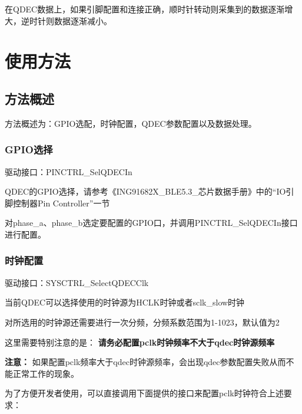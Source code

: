 \documentclass[
  12pt,
]{book}
\newenvironment{Shaded}{\begin{snugshade}}{\end{snugshade}}
\newcommand{\ControlFlowTok}[1]{\textcolor[rgb]{0.13,0.29,0.53}{\textbf{#1}}}
\newcommand{\DataTypeTok}[1]{\textcolor[rgb]{0.13,0.29,0.53}{#1}}
\newcommand{\DecValTok}[1]{\textcolor[rgb]{0.00,0.00,0.81}{#1}}
\newcommand{\NormalTok}[1]{#1}
\begin{document}
在QDEC数据上，如果引脚配置和连接正确，顺时针转动则采集到的数据逐渐增大，逆时针则数据逐渐减小。

\hypertarget{ux4f7fux7528ux65b9ux6cd5-5}{%
\section{使用方法}\label{ux4f7fux7528ux65b9ux6cd5-5}}

\hypertarget{ux65b9ux6cd5ux6982ux8ff0-5}{%
\subsection{方法概述}\label{ux65b9ux6cd5ux6982ux8ff0-5}}

方法概述为：GPIO选配，时钟配置，QDEC参数配置以及数据处理。

\hypertarget{gpioux9009ux62e9}{%
\subsubsection{GPIO选择}\label{gpioux9009ux62e9}}

驱动接口：PINCTRL\_SelQDECIn

QDEC的GPIO选择，请参考《ING91682X\_BLE5.3\_芯片数据手册》中的``IO引脚控制器Pin Controller''一节

对phase\_a、phase\_b选定要配置的GPIO口，并调用PINCTRL\_SelQDECIn接口进行配置。

\hypertarget{ux65f6ux949fux914dux7f6e-1}{%
\subsubsection{时钟配置}\label{ux65f6ux949fux914dux7f6e-1}}

驱动接口：SYSCTRL\_SelectQDECClk

当前QDEC可以选择使用的时钟源为HCLK时钟或者sclk\_slow时钟

对所选用的时钟源还需要进行一次分频，分频系数范围为1-1023，默认值为2

这里需要特别注意的是： \textbf{请务必配置pclk时钟频率不大于qdec时钟源频率}

\textbf{注意：} 如果配置pclk频率大于qdec时钟源频率，会出现qdec参数配置失败从而不能正常工作的现象。

为了方便开发者使用，可以直接调用下面提供的接口来配置pclk时钟符合上述要求：

\begin{Shaded}
\end{Shaded}
\end{document}
